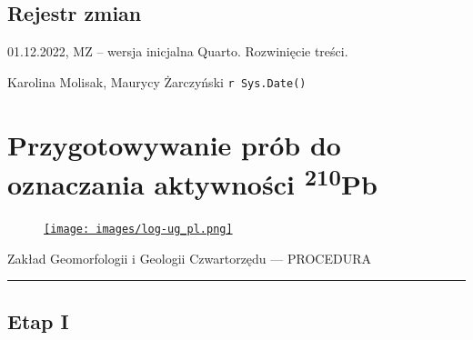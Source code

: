 \documentclass[
  letterpaper,
  DIV=11,
  numbers=noendperiod]{scrreprt}
\begin{document}
\hypertarget{rejestr-zmian-12}{%
\section{Rejestr zmian}\label{rejestr-zmian-12}}

01.12.2022, MZ -- wersja inicjalna Quarto. Rozwinięcie treści.

Karolina Molisak, Maurycy Żarczyński \texttt{r\ Sys.Date()}

\hypertarget{przygotowywanie-pruxf3b-do-oznaczania-aktywnoux15bci-210pb}{%
\chapter{\texorpdfstring{Przygotowywanie prób do oznaczania aktywności
\textsuperscript{210}Pb}{Przygotowywanie prób do oznaczania aktywności 210Pb}}\label{przygotowywanie-pruxf3b-do-oznaczania-aktywnoux15bci-210pb}}

\begin{figure}

\href{https://geomorfologia.ug.edu.pl}{\texttt{[image: images/log-ug\_pl.png]}}

\end{figure}

Zakład Geomorfologii i Geologii Czwartorzędu --- PROCEDURA

\begin{center}\rule{0.5\linewidth}{0.5pt}\end{center}

\hypertarget{etap-i}{%
\section{Etap I}\label{etap-i}}
\end{document}
